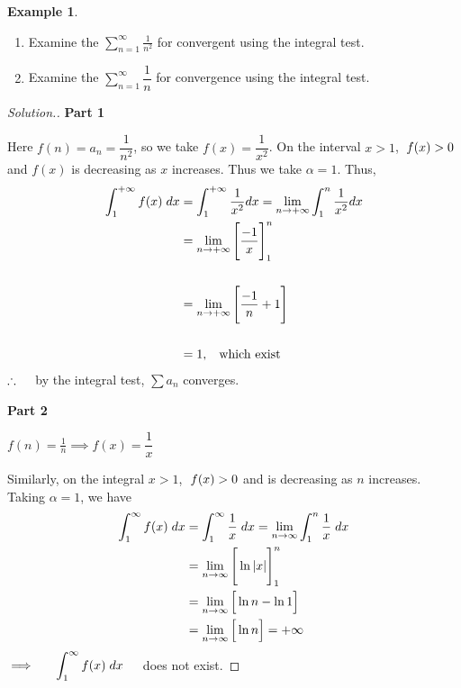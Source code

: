 \documentclass[11pt,a4paper]{article}
\theoremstyle{definition}
\newtheorem{exa}[thm]{Example}
\newenvironment{solution}
  {\renewcommand{\qedsymbol}{}\begin{proof}[\textit{Solution}.]}
  {\end{proof}}
\newcommand{\subhead}[1]{%
  \par\medskip\noindent\textbf{#1}\par\nobreak\smallskip}
\begin{document}
\begin{exa}
\begin{enumerate}
       \item Examine the $\displaystyle{\sum^{\infty}_{n = 1}\frac{1}{n^2}}$ for convergent using the integral test.
       \item Examine the  $\displaystyle{\sum^{\infty}_{n = 1} \dfrac{1}{n}}$ for convergence using the integral test.
\end{enumerate}
\end{exa}

\begin{solution}
\subhead{Part 1}
       Here $f(n) = a_n = \dfrac{1}{n^2}$, so we take $f(x) = \dfrac{1}{x^2}$. On the interval $x>1$,$\hspace{0.2cm} f(x) >0$ and $f(x)$ is decreasing as $x$ increases. Thus we take $\alpha = 1$. Thus, 
       \begin{align*}
       \int_1^{+\infty}f(x)\hspace{0.1cm}dx & = \int_1^{+\infty}\frac{1}{x^2}dx = \lim_{n \rightarrow + \infty} \int_1^n \frac{1}{x^2}dx\\
       & = \lim_{n \rightarrow + \infty}\Bigg[\dfrac{-1}{x}\Bigg]^n_1\\\\
       & = \lim_{n \rightarrow + \infty}\Bigg[\dfrac{-1}{n} + 1\Bigg]\\\\
       & = 1,\hspace{0.3cm}\text{which exist}
       \end{align*}
       $\therefore\hspace{0.4cm}$ by the integral test, $\displaystyle{\sum a_n}$ converges.

\subhead{Part 2}
       $\displaystyle{f(n) = \frac{1}{n} \implies f(x) = \dfrac{1}{x}}$

       Similarly, on the integral $x>1$, $\hspace{0.1cm} f(x)>0$ and is decreasing as $n$ increases. Taking $\alpha = 1$, we have 
       \begin{align*}
        \int_1^{\infty}f(x)\hspace{0.1cm}dx & = \int_1^{\infty}\frac{1}{x}\hspace{0.1cm}dx = \lim_{n\rightarrow \infty}\int_1^n \dfrac{1}{x}\hspace{0.1cm}dx\\
        & = \lim_{n\rightarrow \infty}\Bigg[\ln |x|\Bigg]^n_1\\
        &= \lim_{n\rightarrow \infty}\Big[\ln n - \ln 1\Big]\\
        & = \lim_{n\rightarrow \infty}\Big[\ln n\Big] = +\infty\\
       \end{align*}
       $\implies\hspace{0.5cm}\displaystyle{ \int_1^{\infty}f(x)\hspace{0.1cm}dx}\hspace{0.4cm}$ does not exist.


\end{solution}
\end{document}
